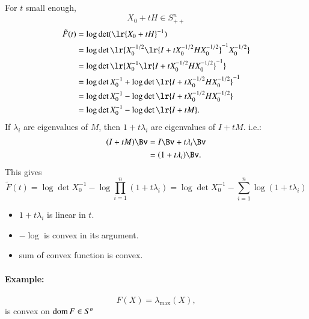 For \( t \) small enough,
%
\begin{equation}\label{eqn:convexOptimizationLecture8:400}
X_0 + t H \in S^n_{++}
\end{equation}
%
\begin{equation}\label{eqn:convexOptimizationLecture8:420}
\begin{aligned}
\tilde{F}(t)
&= \log \det( \lr{X_0 + t H}^{-1} ) \\
&= \log \det\lr{ X_0^{-1/2} \lr{I + t X_0^{-1/2} H X_0^{-1/2} }^{-1} X_0^{-1/2} } \\
&= \log \det\lr{ X_0^{-1} \lr{I + t X_0^{-1/2} H X_0^{-1/2} }^{-1} } \\
&= \log \det X_0^{-1} + \log\det \lr{I + t X_0^{-1/2} H X_0^{-1/2} }^{-1} \\
&= \log \det X_0^{-1} - \log\det \lr{I + t X_0^{-1/2} H X_0^{-1/2} } \\
&= \log \det X_0^{-1} - \log\det \lr{I + t M }.
\end{aligned}
\end{equation}
%
If \( \lambda_i \) are eigenvalues of \( M \), then \( 1 + t \lambda_i \) are eigenvalues of \( I + t M \).  i.e.:
%
\begin{equation}\label{eqn:convexOptimizationLecture8:440}
\begin{aligned}
(I + t M) \Bv
&= I \Bv + t \lambda_i \Bv \\
&= (1 + t \lambda_i) \Bv.
\end{aligned}
\end{equation}
%
This gives
%
\begin{equation}\label{eqn:convexOptimizationLecture8:460}
\tilde{F}(t)
= \log \det X_0^{-1} - \log \prod_{i = 1}^n (1 + t \lambda_i)
= \log \det X_0^{-1} - \sum_{i = 1}^n \log (1 + t \lambda_i)
\end{equation}
%
\begin{itemize}
\item \( 1 + t \lambda_i \) is linear in \( t \).
\item \( -\log \) is convex in its argument.
\item sum of convex function is convex.
\end{itemize}

\paragraph{Example:}
%
\begin{equation}\label{eqn:convexOptimizationLecture8:480}
F(X) = \lambda_\max(X),
\end{equation}
%
is convex on \( \operatorname{dom} F \in S^n \)

